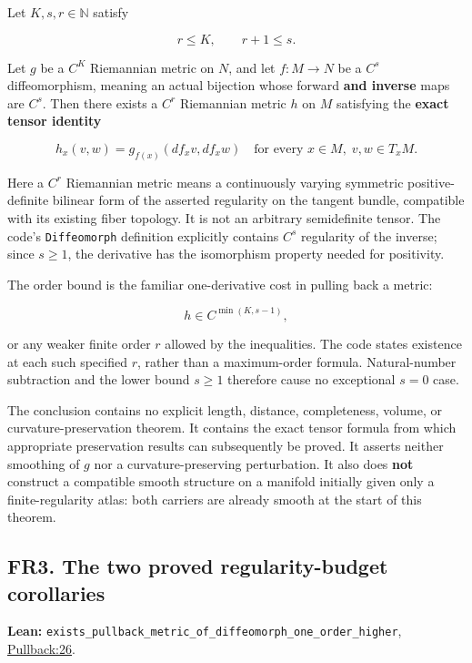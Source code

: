 \documentclass[
  letterpaper,
  11pt]{article}
\begin{document}
Let \(K,s,r\in\mathbb N\) satisfy

\[
                 r\leq K,\qquad r+1\leq s.
\]

Let \(g\) be a \(C^K\) Riemannian metric on \(N\), and let \(f:M\to N\)
be a \(C^s\) diffeomorphism, meaning an actual bijection whose forward
\textbf{and inverse} maps are \(C^s\). Then there exists a \(C^r\)
Riemannian metric \(h\) on \(M\) satisfying the \textbf{exact tensor
identity}

\[
          h_x(v,w)=g_{f(x)}(df_xv,df_xw)
          \quad\text{for every }x\in M,\;v,w\in T_xM.
\]

Here a \(C^r\) Riemannian metric means a continuously varying symmetric
positive-definite bilinear form of the asserted regularity on the
tangent bundle, compatible with its existing fiber topology. It is not
an arbitrary semidefinite tensor. The code's
{\small\texttt{Diffeomorph}} definition explicitly contains \(C^s\)
regularity of the inverse; since \(s\geq1\), the derivative has the
isomorphism property needed for positivity.

The order bound is the familiar one-derivative cost in pulling back a
metric:

\[
                h\in C^{\min(K,s-1)},
\]

or any weaker finite order \(r\) allowed by the inequalities. The code
states existence at each such specified \(r\), rather than a
maximum-order formula. Natural-number subtraction and the lower bound
\(s\geq1\) therefore cause no exceptional \(s=0\) case.

The conclusion contains no explicit length, distance, completeness,
volume, or curvature-preservation theorem. It contains the exact tensor
formula from which appropriate preservation results can subsequently be
proved. It asserts neither smoothing of \(g\) nor a curvature-preserving
perturbation. It also does \textbf{not} construct a compatible smooth
structure on a manifold initially given only a finite-regularity atlas:
both carriers are already smooth at the start of this theorem.

\subsection{FR3. The two proved regularity-budget
corollaries}\label{fr3}

\textbf{Lean:}
{\small\texttt{exists\_\allowbreak{}pullback\_\allowbreak{}metric\_\allowbreak{}of\_\allowbreak{}diffeomorph\_\allowbreak{}one\_\allowbreak{}order\_\allowbreak{}higher}},
\href{https://github.com/qinz1yang/differential-geometry-dev/blob/ea0fae60ee01ef8c8d9b57a51794c6538f679c5d/DifferentialGeometry/Geometry/Metric/Pullback/FiniteRegularity.lean\#L26}{Pullback:26}.
\end{document}
